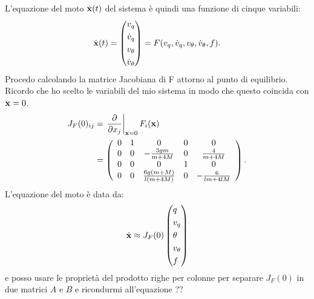 L'equazione del moto $\dot {\mathbf{x}}(t)$ del sistema è quindi una funzione di cinque variabili:
\begin{equation*}
    \dot {\mathbf{x}}(t) = \left(
    \begin{aligned}
        v_q \\
        \dot v_q \\
        v_\theta \\
        \dot v_\theta
    \end{aligned}
    \right) = F(v_q, \dot v_q, v_\theta, \dot v_\theta, f).
\end{equation*}
Procedo calcolando la matrice Jacobiana di F attorno al punto di equilibrio. Ricordo che ho scelto le variabili del mio sistema in modo che questo coincida con $\mathbf{x} = 0$.
\begin{equation*}
    \begin{aligned}
        J_F(0)_{ij} &= \left. \frac \partial {\partial x_j} \right|_{\mathbf{x} = 0} F_i(\mathbf{x}) \\
        &= \left(\begin{array}{ccccc}0&1&0&0&0\\0&0&-\frac{3gm}{m+4M}&0&\frac{4}{m+4M}\\0&0&0&1&0\\0&0&\frac{6g(m+M)}{l(m+4M)}&0&-\frac{6}{lm+4lM}\\\end{array}\right) .
    \end{aligned}
\end{equation*}
L'equazione del moto è data da:
\begin{equation*}
    \dot {\mathbf{x}} \approx J_F(0) \left( \begin{aligned}
                                          &q \\
                                          &v_q \\
                                          &\theta \\
                                          &v_\theta \\
                                          &f
    \end{aligned}  \right)
\end{equation*}
e posso usare le proprietà del prodotto righe per colonne per separare $J_F(0)$ in due matrici $A$ e $B$ e ricondurmi all'equazione ?? 
